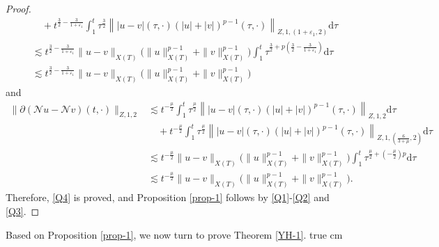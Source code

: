 \documentclass[11pt,twoside]{article}
\newcommand{\p}{\partial}
\newcommand{\ve}{\varepsilon}
\newcommand{\f}{\frac}
\theoremstyle{plain}
\theoremstyle{definition}
\theoremstyle{remark}
\numberwithin{equation}{section}
\begin{document}
\begin{proof}
\begin{equation}
\begin{aligned}
&\quad+t^{\f32-\f{3}{1+\ve_1}}\int_{1}^{t} \tau^{\f32}\left\||u-v|(\tau, \cdot)(|u|+|v|)^{p-1}(\tau, \cdot)\right\|_{Z, 1,(1+\ve_1, 2)}\mathrm{d}\tau\\
&\lesssim t^{\f32-\f{3}{1+\ve_1}} \|u-v\|_{X(T)}\big(\|u\|_{X(T)}^{p-1}+\|v\|_{X(T)}^{p-1}\big)\int_{1}^{t} \tau^{\f32+p(\f32-\f{3}{1+\ve_1})}\mathrm{d}\tau\\
&\lesssim t^{\f32-\f{3}{1+\ve_1}} \|u-v\|_{X(T)}\big(\|u\|_{X(T)}^{p-1}+\|v\|_{X(T)}^{p-1}\big)
\end{aligned}
\end{equation}
and
\begin{equation}\label{L21'}
\begin{aligned}
\|\p(\mathcal{N} u-\mathcal{N} v)(t, \cdot)\|_{Z, 1, 2}&
\lesssim t^{-\f{\mu}{2}}\int_{1}^{t} \tau^{\f{\mu}{2}}\left\||u-v|(\tau, \cdot)(|u|+|v|)^{p-1}(\tau, \cdot)\right\|_{Z, 1,2}\mathrm{d}\tau\\
&\quad+t^{-\f{\mu}{2}}\int_{1}^{t} \tau^{\f{\mu}{2}}\left\||u-v|(\tau, \cdot)(|u|+|v|)^{p-1}(\tau, \cdot)\right\|_{Z, 1,(\f{6}{3+\mu}, 2)}\mathrm{d}\tau\\
&\lesssim t^{-\f{\mu}{2}} \|u-v\|_{X(T)}\big(\|u\|_{X(T)}^{p-1}+\|v\|_{X(T)}^{p-1}\big)\int_{1}^{t} \tau^{\f{\mu}{2}+(-\f{\mu}{2})p}\mathrm{d}\tau\\
&\lesssim t^{-\f{\mu}{2}} \|u-v\|_{X(T)}\big(\|u\|_{X(T)}^{p-1}+\|v\|_{X(T)}^{p-1}\big).
\end{aligned}
\end{equation}
Therefore, \eqref{Q4} is proved, and Proposition \ref{prop-1} follows by \eqref{Q1}-\eqref{Q2} and \eqref{Q3}.
\end{proof}



Based on Proposition \ref{prop-1}, we now turn to prove Theorem \ref{YH-1}.
 true cm
\end{document}
